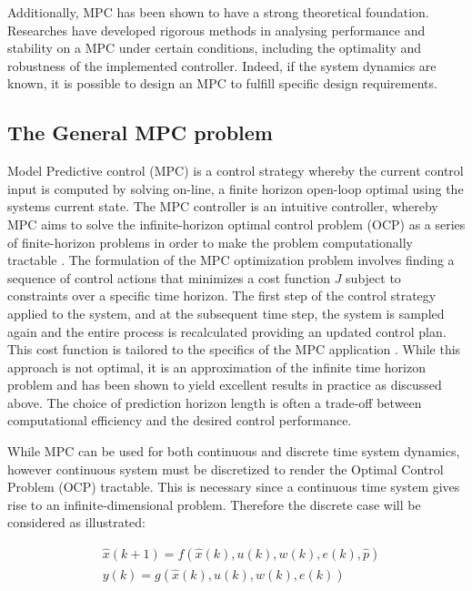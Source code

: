Additionally, MPC has been shown to have a strong theoretical foundation. Researches have developed rigorous methods in analysing performance and stability on a MPC under certain conditions, including the optimality and robustness of the implemented controller. Indeed, if the system dynamics are known, it is possible to design an MPC to fulfill specific design requirements. \cite{rawlingsModelPredictiveControl2017}

\subsection {The General MPC problem}
Model Predictive control (MPC) is a control strategy whereby the current control input is computed by solving on-line, a finite horizon open-loop optimal using the systems current state.
The MPC controller is an intuitive controller, whereby MPC aims to solve the infinite-horizon optimal control problem (OCP) as a series of finite-horizon problems in order to make the problem computationally tractable \cite{beckenbachAddressingInfinitehorizonOptimization2018}. The formulation of the MPC optimization problem involves finding a sequence of control actions that minimizes a cost function $J$ subject to constraints over a specific time horizon. The first step of the control strategy applied to the system, and at the subsequent time step, the system is sampled again and the entire process is recalculated providing an updated control plan. This cost function is tailored to the specifics of the MPC application \cite{rawlingsModelPredictiveControl2017}. While this approach is not optimal, it is an approximation of the infinite time horizon problem and has been shown to yield excellent results in practice as discussed above. The choice of prediction horizon length is often a trade-off between computational efficiency and the desired control performance. 

While MPC can be used for both continuous and discrete time system dynamics, however continuous system must be discretized to render the Optimal Control Problem (OCP) tractable. This is necessary since a continuous time system gives rise to an infinite-dimensional problem. Therefore the discrete case will be considered as illustrated:

\begin{equation}
	\begin{aligned}
		& \hat x(k+1) = f(\hat x(k),u(k),w(k),e(k), \hat p) \\
		& y(k) = g(\hat x(k),u(k),w(k),e(k))
	\end{aligned}
	\label{eq: discrete system dynamics}
\end{equation}

